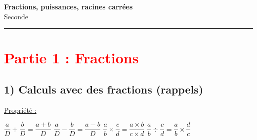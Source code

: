 \documentclass[12pt]{article}
\begin{document}

\newpage

\begin{center}
    {\LARGE \textbf{Fractions, puissances, racines carrées}}\\[4mm]
    {\large Seconde}
\end{center}

\hrule
\vspace{0pt}


\section*{\textcolor{red}{Partie 1 : Fractions}}

\subsection*{\hspace{1cm} 1) Calculs avec des fractions (rappels)}

\begin{mdframed}[
    linewidth=1pt,
    roundcorner=5pt,
    linecolor=Red,
    innertopmargin=10pt,
    innerbottommargin=10pt
]
{\color{red}
\underline{Propriété :}

\begin{center}
    $\dfrac{a}{D} + \dfrac{b}{D} = \dfrac{a+b}{D}$
    \hspace{1cm}$\dfrac{a}{D} - \dfrac{b}{D} = \dfrac{a-b}{D}$
    \hspace{1cm}$\dfrac{a}{b} \times \dfrac{c}{d} = \dfrac{a \times b}{c \times d}$
    \hspace{1cm}$\dfrac{a}{b} \div \dfrac{c}{d} = \dfrac{a}{b} \times \dfrac{d}{c}$
\end{center}
}
\end{mdframed}
\end{document}
